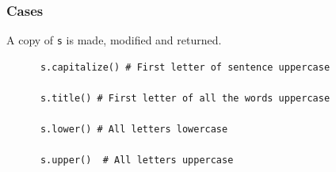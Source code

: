 \begin{frame}[fragile]\frametitle{Cases}
A copy of \texttt{s} is made, modified and returned.
  \begin{lstlisting}
      s.capitalize() # First letter of sentence uppercase

      s.title() # First letter of all the words uppercase

      s.lower() # All letters lowercase

      s.upper()  # All letters uppercase
  \end{lstlisting}
\end{frame}




